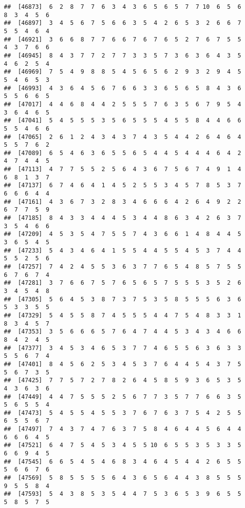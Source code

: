 \documentclass[
]{book}
\begin{document}
\begin{verbatim}
##  [46873]  6  2  8  7  7  6  3  4  3  6  5  6  5  7  7 10  6  5  6  8  3  4  5  6
##  [46897]  3  4  5  6  7  5  6  6  3  5  4  2  6  5  3  2  6  6  7  5  5  4  6  4
##  [46921]  3  6  6  8  7  7  6  6  7  6  7  6  5  2  7  6  7  5  5  4  3  7  6  6
##  [46945]  8  4  3  7  7  2  7  7  3  3  5  7  3  6  3  6  4  3  5  4  6  2  5  4
##  [46969]  7  5  4  9  8  8  5  4  5  6  5  6  2  9  3  2  9  4  5  5  4  6  5  3
##  [46993]  4  3  6  4  5  6  7  6  6  3  3  6  5  6  5  8  4  3  6  5  5  6  6  5
##  [47017]  4  4  6  8  4  4  2  5  5  5  7  6  3  5  6  7  9  5  4  3  6  4  6  5
##  [47041]  5  4  5  5  5  3  5  6  5  5  5  4  5  5  8  4  4  6  6  5  5  4  6  6
##  [47065]  2  6  1  2  4  3  4  3  7  4  3  5  4  4  2  6  4  6  4  5  5  7  6  2
##  [47089]  6  5  4  6  3  6  5  5  6  5  4  4  5  4  4  4  6  4  2  4  7  4  4  5
##  [47113]  4  7  7  5  5  2  5  6  4  3  6  7  5  6  7  4  9  1  4  6  8  1  3  7
##  [47137]  6  7  4  6  4  1  4  5  2  5  5  3  4  5  7  8  5  3  7  6  6  6  4  4
##  [47161]  4  3  6  7  3  2  8  3  4  6  6  6  4  2  6  4  9  2  2  6  7  7  5  9
##  [47185]  8  4  3  3  4  4  4  5  3  4  4  8  6  3  4  2  6  3  7  3  5  4  6  6
##  [47209]  4  5  3  5  4  7  5  5  7  4  3  6  6  1  4  8  4  4  5  3  6  5  4  5
##  [47233]  5  4  3  4  6  4  1  5  5  4  4  5  5  4  5  3  7  4  4  5  5  2  5  6
##  [47257]  7  4  2  4  5  5  3  6  3  7  7  6  5  4  8  5  7  5  5  6  7  6  7  4
##  [47281]  3  7  6  6  7  5  7  6  5  6  5  7  5  5  5  3  5  2  6  3  4  5  4  8
##  [47305]  5  6  4  5  3  8  7  3  7  5  3  5  8  5  5  5  6  3  6  5  3  3  5  5
##  [47329]  5  4  5  5  8  7  4  5  5  5  4  4  7  5  4  8  3  3  1  8  3  4  5  7
##  [47353]  3  5  6  6  6  5  7  6  4  7  4  4  5  3  4  3  4  6  6  8  4  2  4  5
##  [47377]  3  4  5  3  4  6  5  3  7  7  4  6  5  5  6  3  6  3  3  5  5  6  7  4
##  [47401]  8  4  5  6  2  5  3  4  5  3  7  6  4  4  5  4  3  7  5  5  6  7  3  5
##  [47425]  7  7  5  7  2  7  8  2  6  4  5  8  5  9  3  6  5  3  5  4  3  6  3  6
##  [47449]  4  4  7  5  5  5  2  5  6  7  7  3  5  7  7  6  6  3  5  5  6  5  5  4
##  [47473]  5  4  5  5  4  5  5  3  7  6  7  6  3  7  5  4  2  5  5  6  5  5  6  7
##  [47497]  7  4  3  7  4  7  6  3  7  5  8  4  6  4  4  5  6  4  4  6  6  6  4  5
##  [47521]  6  4  7  5  4  5  3  4  5  5 10  6  5  5  3  5  3  3  5  6  6  9  4  5
##  [47545]  6  6  5  4  5  4  6  8  3  4  6  4  5  4  4  2  6  5  5  5  6  6  7  6
##  [47569]  5  8  5  5  5  5  6  4  3  6  5  6  4  4  3  8  5  5  5  9  5  5  8  4
##  [47593]  5  4  3  8  5  3  5  4  4  7  5  3  6  5  3  9  6  5  5  5  8  5  7  5

\end{verbatim}
\end{document}
